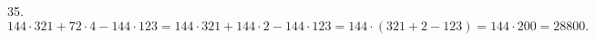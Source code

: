 35. $144\cdot321+72\cdot4-144\cdot123=144\cdot321+144\cdot2-144\cdot123=144\cdot(321+2-123)=144\cdot200=28800.$\\
